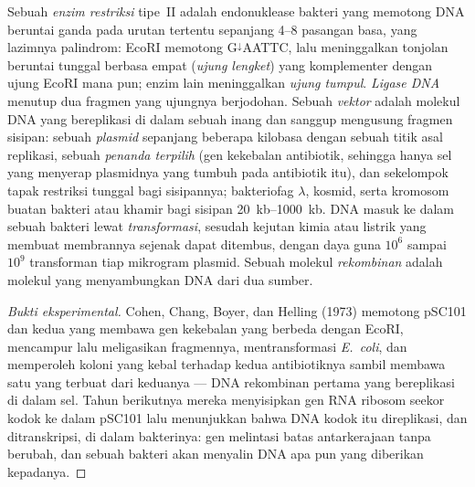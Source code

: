 \begin{definition}\label{def:b3:genetic-engineering:tools}
%
Sebuah \emph{enzim restriksi} tipe~II adalah endonuklease bakteri yang
memotong DNA beruntai ganda pada urutan tertentu sepanjang \numrange{4}{8}
pasangan basa, yang lazimnya palindrom: EcoRI memotong G$^{\downarrow}$AATTC,
lalu meninggalkan tonjolan beruntai tunggal berbasa empat (\emph{ujung
lengket}) yang komplementer dengan ujung EcoRI mana pun; enzim lain
meninggalkan \emph{ujung tumpul}. \emph{Ligase DNA} menutup dua fragmen yang
ujungnya berjodohan. Sebuah \emph{vektor} adalah molekul DNA yang bereplikasi
di dalam sebuah inang dan sanggup mengusung fragmen sisipan: sebuah
\emph{plasmid} sepanjang beberapa kilobasa dengan sebuah titik asal replikasi,
sebuah \emph{penanda terpilih} (gen kekebalan antibiotik, sehingga hanya sel
yang menyerap plasmidnya yang tumbuh pada antibiotik itu), dan sekelompok
tapak restriksi tunggal bagi sisipannya; bakteriofag $\lambda$, kosmid, serta
kromosom buatan bakteri atau khamir bagi sisipan \qtyrange{20}{1000}{kb}. DNA
masuk ke dalam sebuah bakteri lewat \emph{transformasi}, sesudah kejutan kimia
atau listrik yang membuat membrannya sejenak dapat ditembus, dengan daya guna
$10^{6}$ sampai $10^{9}$ transforman tiap mikrogram plasmid. Sebuah molekul
\emph{rekombinan} adalah molekul yang menyambungkan DNA dari dua sumber.
\end{definition}

\begin{proof}[Bukti eksperimental]
Cohen, Chang, Boyer, dan Helling (1973) memotong  pSC101 dan
 kedua yang membawa gen kekebalan yang berbeda dengan EcoRI, mencampur
lalu meligasikan fragmennya, mentransformasi \emph{E.~coli}, dan memperoleh
koloni yang kebal terhadap kedua antibiotiknya sambil membawa satu 
yang terbuat dari keduanya --- DNA rekombinan pertama yang bereplikasi di
dalam sel. Tahun berikutnya mereka menyisipkan gen RNA ribosom seekor kodok ke
dalam pSC101 lalu menunjukkan bahwa DNA kodok itu direplikasi, dan
ditranskripsi, di dalam bakterinya: gen melintasi batas antarkerajaan tanpa
berubah, dan sebuah bakteri akan menyalin DNA apa pun yang diberikan kepadanya.
\end{proof}

